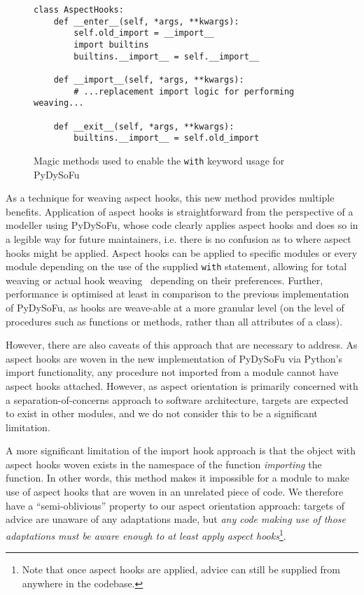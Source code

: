 \begin{figure}[t]
\begin{lstlisting}
class AspectHooks:
    def __enter__(self, *args, **kwargs):
        self.old_import = __import__
        import builtins
        builtins.__import__ = self.__import__

    def __import__(self, *args, **kwargs):
        # ...replacement import logic for performing weaving...

    def __exit__(self, *args, **kwargs):
        builtins.__import__ = self.old_import
\end{lstlisting}
    
    \caption{Magic methods used to enable the \lstinline{with} keyword usage for
    PyDySoFu}
    \label{fig:aspecthooksmagicmethodswith}
\end{figure}


As a technique for weaving aspect hooks, this new method provides multiple
benefits. Application of aspect hooks is straightforward from the perspective of
a modeller using PyDySoFu, whose code clearly applies aspect hooks and does so
in a legible way for future maintainers, i.e. there is no confusion as to where
aspect hooks might be applied. Aspect hooks can be applied to specific modules
or every module depending on the use of the supplied \lstinline{with} statement,
allowing for total weaving or actual hook weaving~\cite{dynamicAOchitchyan}
depending on their preferences. Further, performance is optimised at least in
comparison to the previous implementation of PyDySoFu, as hooks are weave-able
at a more granular level (on the level of procedures such as functions or
methods, rather than all attributes of a class).

However, there are also caveats of this approach that are necessary to address.
As aspect hooks are woven in the new implementation of PyDySoFu via Python's
import functionality, any procedure not imported from a module cannot have
aspect hooks attached. However, as
aspect orientation is primarily concerned with a separation-of-concerns approach
to software architecture, targets are expected to exist in other modules, and we
do not consider this to be a significant limitation.

A more significant limitation of the import hook approach is that the object
with aspect hooks woven exists in the namespace of the function \emph{importing}
the function. In other words, this method makes it impossible for a module to
make use of aspect hooks that are woven in an unrelated piece of code. We
therefore have a ``semi-oblivious'' property to our aspect orientation approach:
targets of advice are unaware of any adaptations made, but \emph{any code making
use of those adaptations must be aware enough to at least apply aspect
hooks}\footnote{Note that once aspect hooks are applied, advice can still be
supplied from anywhere in the codebase.}.

